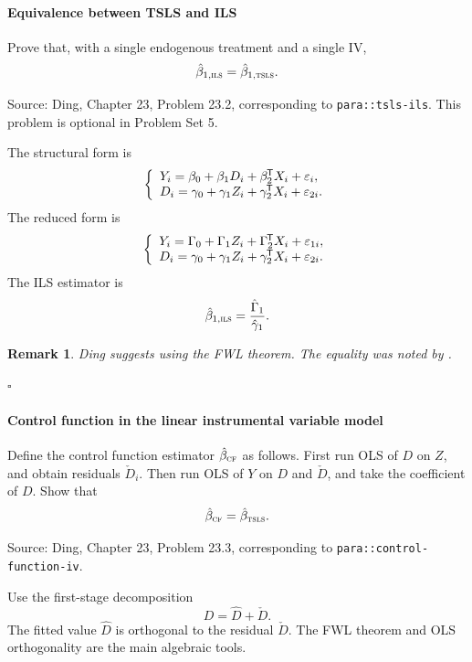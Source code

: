 \documentclass[krantz1]{krantz}
\newcommand{\ri}[1]{\lstinline{#1}}
\newenvironment{mysolution}[1]{\vspace{0.1in} \noindent {\bfseries Solution to Problem {#1}:}}{\hfill$\square$}
\newtheorem{remark}{Remark}
\newcommand*{\tran }{^{\mkern-1.5mu\mathsf{T}}}
\def\TSLS{\textsc{tsls}}
\def\ILS{\textsc{ils}}
\begin{document}
\paragraph{Equivalence between TSLS and ILS}\label{para::tsls-ils-hw}

Prove that, with a single endogenous treatment and a single IV,
\[
\hat\beta_{1,\ILS}=\hat\beta_{1,\TSLS}.
\]

Source: Ding, Chapter 23, Problem 23.2, corresponding to
\ri{para::tsls-ils}. This problem is optional in Problem Set 5.

The structural form is
\[
\left\{
\begin{array}{l}
Y_i=\beta_0+\beta_1D_i+\beta_2\tran X_i+\varepsilon_i,\\
D_i=\gamma_0+\gamma_1Z_i+\gamma_2\tran X_i+\varepsilon_{2i}.
\end{array}
\right.
\]
The reduced form is
\[
\left\{
\begin{array}{l}
Y_i=\Gamma_0+\Gamma_1Z_i+\Gamma_2\tran X_i+\varepsilon_{1i},\\
D_i=\gamma_0+\gamma_1Z_i+\gamma_2\tran X_i+\varepsilon_{2i}.
\end{array}
\right.
\]
The ILS estimator is
\[
\hat\beta_{1,\ILS}=\frac{\hat\Gamma_1}{\hat\gamma_1}.
\]

\begin{remark}
Ding suggests using the FWL theorem. The equality was noted by
\citet[][Section A.3]{imbens2014instrumental}.
\end{remark}

\begin{mysolution}{23.2}

\end{mysolution}

\paragraph{Control function in the linear instrumental variable model}\label{para::control-function-iv-hw}

Define the control function estimator \(\hat\beta_{\textsc{cf}}\) as follows.
First run OLS of \(D\) on \(Z\), and obtain residuals \(\check D_i\). Then run
OLS of \(Y\) on \(D\) and \(\check D\), and take the coefficient of \(D\). Show
that
\[
\hat\beta_{\textsc{cf}}=\hat\beta_\TSLS.
\]

Source: Ding, Chapter 23, Problem 23.3, corresponding to
\ri{para::control-function-iv}.

Use the first-stage decomposition
\[
D=\hat D+\check D.
\]
The fitted value \(\hat D\) is orthogonal to the residual \(\check D\). The
FWL theorem and OLS orthogonality are the main algebraic tools.
\end{document}
